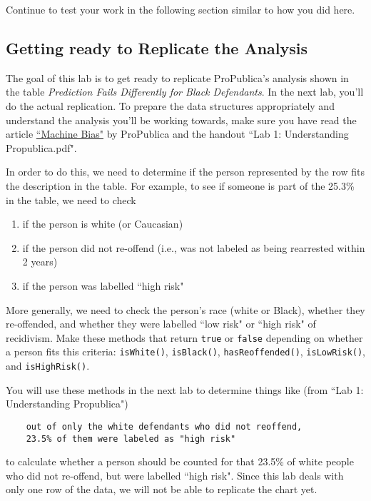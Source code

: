 \documentclass[12pt]{article}
\begin{document}

Continue to test your work in the following section similar to how you did here.

\subsection{Getting ready to Replicate the Analysis}
The goal of this lab is to get ready to replicate ProPublica's analysis shown in the table \textit{Prediction Fails Differently for Black Defendants}.  In the next lab, you'll do the actual replication.  To prepare the data structures appropriately and understand the analysis you'll be working towards, make sure you have read the article \href{https://www.propublica.org/article/machine-bias-risk-assessments-in-criminal-sentencing}{``Machine Bias"} by ProPublica and the handout ``Lab 1: Understanding Propublica.pdf".

In order to do this, we need to determine if the person represented by the row fits the description in the table. For example, to see if someone is part of the 25.3\% in the table, we need to check
\begin{enumerate}
    \item if the person is white (or Caucasian)
    \item if the person did not re-offend (i.e., was not labeled as being rearrested within 2 years)
    \item if the person was labelled ``high risk"
\end{enumerate}

More generally, we need to check the person's race (white or Black), whether they re-offended, and whether they were labelled ``low risk" or ``high risk" of recidivism. Make these methods that return \texttt{true} or \texttt{false} depending on whether a person fits this criteria: \texttt{isWhite()}, \texttt{isBlack()}, \texttt{hasReoffended()}, \texttt{isLowRisk()}, and \texttt{isHighRisk()}.

You will use these methods in the next lab to determine things like (from ``Lab 1: Understanding Propublica")
\begin{verbatim}
    out of only the white defendants who did not reoffend,
    23.5% of them were labeled as "high risk"
\end{verbatim}
to calculate whether a person should be counted for that 23.5\% of white people who did not re-offend, but were labelled ``high risk".  Since this lab deals with only one row of the data, we will not be able to replicate the chart yet.
\end{document}
